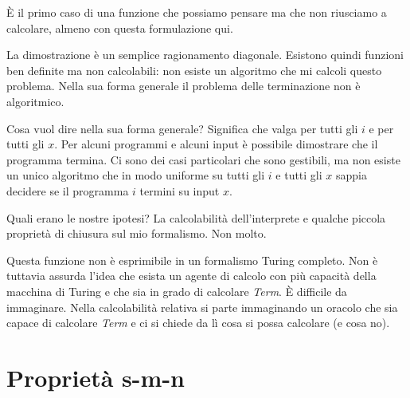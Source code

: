 %
%
%
%
%
%
%
%

È il primo caso di una funzione che possiamo pensare ma che non riusciamo a calcolare, almeno con questa
formulazione qui.

La dimostrazione è un semplice ragionamento diagonale. Esistono quindi funzioni ben definite ma non
calcolabili: non esiste un algoritmo che mi calcoli questo problema. Nella sua forma generale il
problema delle terminazione non è algoritmico.

Cosa vuol dire nella sua forma generale? Significa che valga per tutti gli $i$ e per tutti gli $x$.
Per alcuni programmi e alcuni input è possibile dimostrare che il programma termina. Ci sono dei
casi particolari che sono gestibili, ma non esiste un unico algoritmo che in modo uniforme su tutti
gli $i$ e tutti gli $x$ sappia decidere se il programma $i$ termini su input $x$.

Quali erano le nostre ipotesi? La calcolabilità dell'interprete e qualche piccola proprietà di
chiusura sul mio formalismo. Non molto.

Questa funzione non è esprimibile in un formalismo Turing completo. Non è tuttavia assurda l'idea
che esista un agente di calcolo con più capacità della macchina di Turing e che sia in grado di
calcolare \textit{Term}. È difficile da immaginare. Nella calcolabilità relativa si parte
immaginando un oracolo che sia capace di calcolare \textit{Term} e ci si chiede da lì cosa si possa
calcolare (e cosa no).

\section{Proprietà s-m-n}


